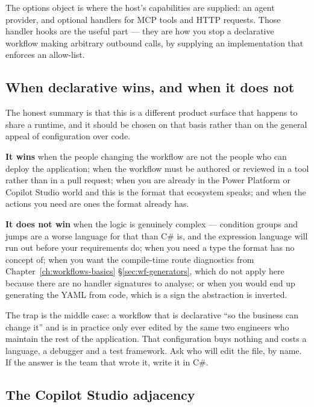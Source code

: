 The options object is where the host's capabilities are supplied: an agent
provider, and optional handlers for MCP tools and HTTP requests. Those handler
hooks are the useful part --- they are how you stop a declarative workflow making
arbitrary outbound calls, by supplying an implementation that enforces an
allow-list.

\subsection{When declarative wins, and when it does not}

The honest summary is that this is a different product surface that happens to
share a runtime, and it should be chosen on that basis rather than on the general
appeal of configuration over code.

\textbf{It wins} when the people changing the workflow are not the people who
can deploy the application; when the workflow must be authored or reviewed in a
tool rather than in a pull request; when you are already in the Power Platform or
Copilot Studio world and this is the format that ecosystem speaks; and when the
actions you need are ones the format already has.

\textbf{It does not win} when the logic is genuinely complex --- condition groups
and jumps are a worse language for that than C\# is, and the expression language
will run out before your requirements do; when you need a type the format has no
concept of; when you want the compile-time route diagnostics from
Chapter~\ref{ch:workflows-basics} \S\ref{sec:wf-generators}, which do not apply
here because there are no handler signatures to analyse; or when you would end
up generating the YAML from code, which is a sign the abstraction is inverted.

\begin{note}
The trap is the middle case: a workflow that is declarative ``so the business can
change it'' and is in practice only ever edited by the same two engineers who
maintain the rest of the application. That configuration buys nothing and costs a
language, a debugger and a test framework. Ask who will edit the file, by name.
If the answer is the team that wrote it, write it in C\#.
\end{note}

\subsection{The Copilot Studio adjacency}

